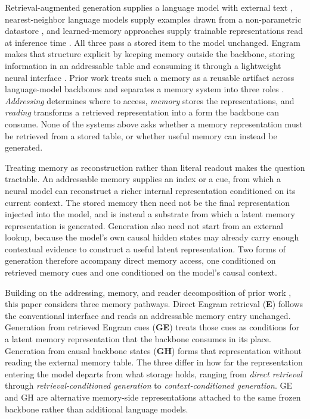 \documentclass{article}
\begin{document}
Retrieval-augmented generation supplies a language model with external text
\citep{lewis2020rag}, nearest-neighbor language models supply examples drawn
from a non-parametric datastore \citep{khandelwal2020knn}, and learned-memory
approaches supply trainable representations read at inference time
\citep{wei2025mlp,cheng2026engram}.
All three pass a stored item to the model unchanged.
Engram makes that structure explicit by keeping memory outside the backbone,
storing information in an addressable table and consuming it through a
lightweight neural interface \citep{cheng2026engram}.
Prior work treats such a memory as a reusable artifact across language-model
backbones and separates a memory system into three roles
\citep{li2026transfer}.
\emph{Addressing} determines where to access, \emph{memory} stores the
representations, and \emph{reading} transforms a retrieved representation into
a form the backbone can consume.
None of the systems above asks whether a memory representation must be
retrieved from a stored table, or whether useful memory can instead be
generated.

Treating memory as reconstruction rather than literal readout makes the
question tractable. An addressable memory supplies an index or a cue, from
which a neural model can reconstruct a richer internal representation
conditioned on its current context.
The stored memory then need not be the final representation injected into the
model, and is instead a substrate from which a latent memory representation is
generated.
Generation also need not start from an external lookup, because the model's
own causal hidden states may already carry enough contextual evidence to
construct a useful latent representation.
Two forms of generation therefore accompany direct memory access, one
conditioned on retrieved memory cues and one conditioned on the model's causal
context.

Building on the addressing, memory, and reader decomposition of prior work
\citep{li2026transfer}, this paper considers three memory pathways.
Direct Engram retrieval (\textbf{E}) follows the conventional interface and
reads an addressable memory entry unchanged.
Generation from retrieved Engram cues (\textbf{GE}) treats those cues as
conditions for a latent memory representation that the backbone consumes in
its place.
Generation from causal backbone states (\textbf{GH}) forms that representation
without reading the external memory table.
The three differ in how far the representation entering the model departs from
what storage holds, ranging from \emph{direct retrieval} through
\emph{retrieval-conditioned generation} to \emph{context-conditioned
generation}.
GE and GH are alternative memory-side representations attached to the same
frozen backbone rather than additional language models.
\end{document}
